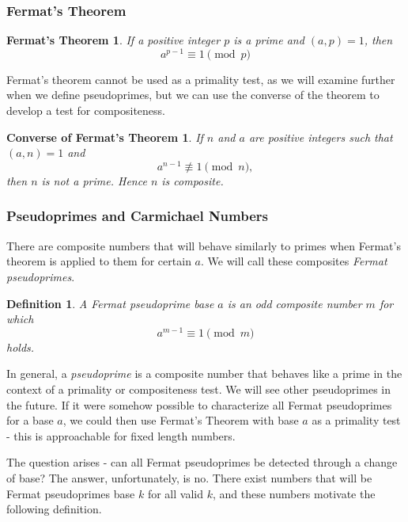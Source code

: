 \documentclass{article}
\newtheorem*{definition}{Definition}
\begin{document}
\subsubsection{Fermat's Theorem}

\newtheorem*{fermattheorem}{Fermat's Theorem}
\begin{fermattheorem}
If a positive integer $p$ is a prime and $(a,p) = 1$, then
	$$a^{p-1} \equiv 1 \pmod p$$
\end{fermattheorem}

\par Fermat's theorem cannot be used as a primality test, as we will examine further when we define pseudoprimes, but we can use the converse of the theorem to develop a test for compositeness.

\newtheorem*{fermatconverse}{Converse of Fermat's Theorem}
\begin{fermatconverse}
If $n$ and $a$ are positive integers such that $(a,n) = 1$ and
	$$a^{n-1} \not\equiv 1 \pmod n,$$
	then $n$ is not a prime. Hence $n$ is composite.
\end{fermatconverse}

\subsubsection{ Pseudoprimes and Carmichael Numbers }
There are composite numbers that will behave similarly to primes when Fermat's theorem is applied to them for certain $a$. We will call these composites \textit{Fermat pseudoprimes}.
\begin{definition}
A \textit{ Fermat pseudoprime} base $a$ is an odd composite number $m$ for which 
$$ a^{m-1} \equiv 1 \pmod m$$  
holds. 
\end{definition}

 \par In general, a \textit{pseudoprime} is a composite number that behaves like a prime in the context of a primality or compositeness test. We will see other pseudoprimes in the future. If it were somehow possible to characterize all Fermat pseudoprimes for a base $a$, we could then use Fermat's Theorem with base $a$ as a primality test - this is approachable for fixed length numbers.
 
 \par The question arises - can all Fermat pseudoprimes be detected through a change of base? The answer, unfortunately, is no.   There exist numbers that will be Fermat pseudoprimes base $k$ for all valid $k$, and these numbers motivate the following definition.
 
\end{document}
